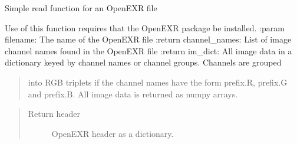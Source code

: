 \documentclass[a4paper,10pt,english]{sphinxmanual}
\begin{document}

\begin{fulllineitems}
\label{packages:radute.readOpenEXR}
Simple read function for an OpenEXR file

Use of this function requires that the OpenEXR package be installed.
:param filename: The name of the OpenEXR file
:return channel\_names: List of image channel names found in the OpenEXR file
:return im\_dict: All image data in a dictionary keyed by channel names or channel groups. Channels are grouped
\begin{quote}

into RGB triplets if the channel names have the form prefix.R, prefix.G and prefix.B.
All image data is returned as numpy arrays.
\end{quote}
\begin{quote}\begin{description}
\item[{Return header}] \leavevmode
OpenEXR header as a dictionary.

\end{description}\end{quote}

\end{fulllineitems}

\end{document}
